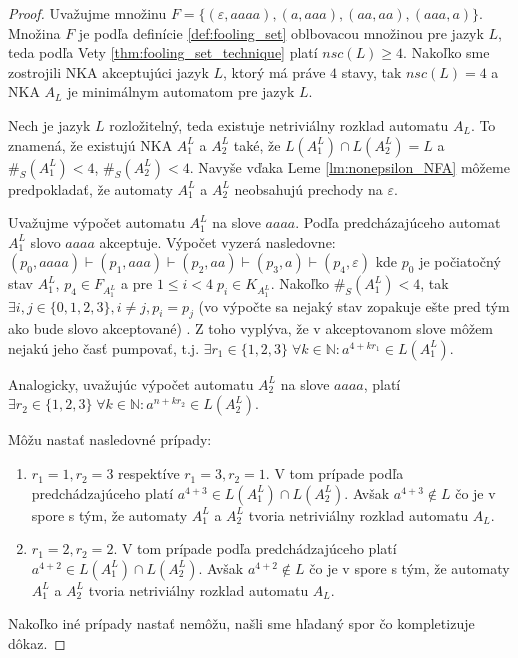 \begin{proof}
Uvažujme množinu $ F = \lbrace (\varepsilon,aaaa),(a,aaa),(aa,aa),(aaa,a)\rbrace $. Množina $ F $ je podľa definície \ref{def:fooling_set} oblbovacou množinou pre jazyk $ L $, teda podľa Vety \ref{thm:fooling_set_technique} platí $ nsc(L) \geq 4 $. Nakoľko sme zostrojili NKA akceptujúci jazyk $ L $, ktorý má práve $ 4 $ stavy, tak $ nsc(L) = 4 $ a NKA $ A_{L} $ je minimálnym automatom pre jazyk $ L $.
\par
Nech je jazyk $ L$ rozložitelný, teda existuje netriviálny rozklad automatu $ A_{L} $. To znamená, že existujú NKA $ A_1^{L} $ a $ A_2^{L} $ také, že $ L(A_1^{L}) \cap L(A_2^{L}) = L $ a $ \#_S(A_1^{L}) < 4 $, $ \#_S(A_2^{L}) < 4 $. Navyše vďaka Leme \ref{lm:nonepsilon_NFA} môžeme predpokladať, že automaty $ A_1^{L} $ a $ A_2^{L} $ neobsahujú prechody na $ \varepsilon $. 
\par
Uvažujme výpočet automatu $ A_1^{L} $ na slove $ aaaa $. Podľa predcházajúceho automat $ A_1^{L} $ slovo $ aaaa $ akceptuje. Výpočet vyzerá nasledovne: $ (p_0,aaaa) \vdash (p_1, aaa) \vdash (p_{2}, aa) \vdash (p_3, a) \vdash (p_4, \varepsilon) $ kde $ p_0 $ je počiatočný stav $ A_1^{L} $, $ p_4 \in F_{A_1^{L}} $ a pre $ 1 \leq i < 4 \; p_i \in K_{A_1^{L}}$. Nakoľko $ \#_S(A_1^{L}) < 4 $, tak $ \exists i,j \in \lbrace 0,1,2,3 \rbrace, i \neq j, p_i=p_j $ (vo výpočte sa nejaký stav zopakuje ešte pred tým ako bude slovo akceptované) . Z toho vyplýva, že v akceptovanom slove môžem nejakú jeho časť pumpovať, t.j. $ \exists r_1 \in \lbrace 1,2,3 \rbrace \; \forall k \in \mathbb{N}: a^{4 + kr_1} \in L(A_1^{L}) $.
\par
Analogicky, uvažujúc výpočet automatu $ A_2^{L} $ na slove $ aaaa $, platí $ \exists r_2 \in \lbrace 1,2,3 \rbrace \; \forall k \in \mathbb{N}: a^{n + kr_2} \in L(A_2^{L}) $.
\par
Môžu nastať nasledovné prípady:
\begin{enumerate}
\item $ r_1 = 1, r_2 = 3 $ respektíve $ r_1 = 3, r_2 = 1 $. V tom prípade podľa predchádzajúceho platí $ a^{4+3} \in L(A_1^{L}) \cap L(A_2^{L}) $. Avšak $ a^{4+3} \notin L $ čo je v spore s tým, že automaty $ A_1^{L} $ a $ A_2^{L} $ tvoria netriviálny rozklad automatu $ A_{L} $.
\item $ r_1 = 2, r_2 = 2 $. V tom prípade podľa predchádzajúceho platí $ a^{4+2} \in L(A_1^{L}) \cap L(A_2^{L}) $. Avšak $ a^{4+2} \notin L $ čo je v spore s tým, že automaty $ A_1^{L} $ a $ A_2^{L} $ tvoria netriviálny rozklad automatu $ A_{L} $.
\end{enumerate}
Nakoľko iné prípady nastať nemôžu, našli sme hľadaný spor čo kompletizuje dôkaz.
\end{proof}













